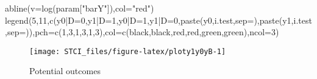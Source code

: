 \documentclass[
]{book}
\newenvironment{Shaded}{\begin{snugshade}}{\end{snugshade}}
\newcommand{\AttributeTok}[1]{\textcolor[rgb]{0.77,0.63,0.00}{#1}}
\newcommand{\DecValTok}[1]{\textcolor[rgb]{0.00,0.00,0.81}{#1}}
\newcommand{\FunctionTok}[1]{\textcolor[rgb]{0.00,0.00,0.00}{#1}}
\newcommand{\NormalTok}[1]{#1}
\newcommand{\StringTok}[1]{\textcolor[rgb]{0.31,0.60,0.02}{#1}}
\theoremstyle{definition}
\theoremstyle{definition}
\theoremstyle{definition}
\theoremstyle{definition}
\theoremstyle{remark}
\begin{document}
\begin{Shaded}
\begin{Highlighting}[]
\FunctionTok{abline}\NormalTok{(}\AttributeTok{v=}\FunctionTok{log}\NormalTok{(param[}\StringTok{"barY"}\NormalTok{]),}\AttributeTok{col=}\StringTok{"red"}\NormalTok{)}
\FunctionTok{legend}\NormalTok{(}\DecValTok{5}\NormalTok{,}\DecValTok{11}\NormalTok{,}\FunctionTok{c}\NormalTok{(}\StringTok{\textquotesingle{}y0|D=0\textquotesingle{}}\NormalTok{,}\StringTok{\textquotesingle{}y1|D=1\textquotesingle{}}\NormalTok{,}\StringTok{\textquotesingle{}y0|D=1\textquotesingle{}}\NormalTok{,}\StringTok{\textquotesingle{}y1|D=0\textquotesingle{}}\NormalTok{,}\FunctionTok{paste}\NormalTok{(}\StringTok{\textquotesingle{}y0\textquotesingle{}}\NormalTok{,i.test,}\AttributeTok{sep=}\StringTok{\textquotesingle{}\textquotesingle{}}\NormalTok{),}\FunctionTok{paste}\NormalTok{(}\StringTok{\textquotesingle{}y1\textquotesingle{}}\NormalTok{,i.test,}\AttributeTok{sep=}\StringTok{\textquotesingle{}\textquotesingle{}}\NormalTok{)),}\AttributeTok{pch=}\FunctionTok{c}\NormalTok{(}\DecValTok{1}\NormalTok{,}\DecValTok{3}\NormalTok{,}\DecValTok{1}\NormalTok{,}\DecValTok{3}\NormalTok{,}\DecValTok{1}\NormalTok{,}\DecValTok{3}\NormalTok{),}\AttributeTok{col=}\FunctionTok{c}\NormalTok{(}\StringTok{\textquotesingle{}black\textquotesingle{}}\NormalTok{,}\StringTok{\textquotesingle{}black\textquotesingle{}}\NormalTok{,}\StringTok{\textquotesingle{}red\textquotesingle{}}\NormalTok{,}\StringTok{\textquotesingle{}red\textquotesingle{}}\NormalTok{,}\StringTok{\textquotesingle{}green\textquotesingle{}}\NormalTok{,}\StringTok{\textquotesingle{}green\textquotesingle{}}\NormalTok{),}\AttributeTok{ncol=}\DecValTok{3}\NormalTok{)}
\end{Highlighting}
\end{Shaded}

\begin{figure}

{\centering \texttt{[image: STCI\_files/figure-latex/ploty1y0yB-1]} 

}

\caption{Potential outcomes}\label{fig:ploty1y0yB}
\end{figure}
\end{document}
